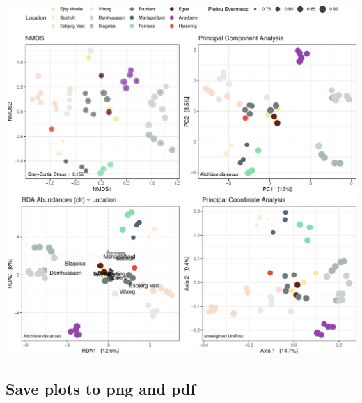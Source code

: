\documentclass[
]{book}
\begin{document}
\includegraphics{gitbook-demo_files/figure-latex/plotbeta-1.pdf}

\hfill\break

\hypertarget{save-plots-to-png-and-pdf}{%
\subsection{Save plots to png and pdf}\label{save-plots-to-png-and-pdf}}
\end{document}

